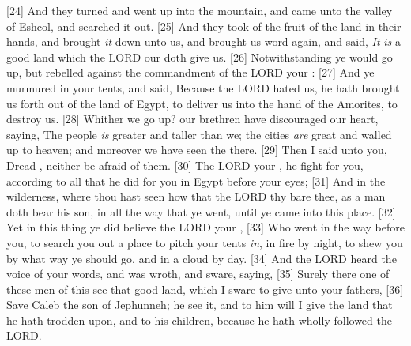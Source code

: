 [24] \textcolor[cmyk]{0.99998,1,0,0}{And they turned and went up into the mountain, and came unto the valley of Eshcol, and searched it out.}
[25] \textcolor[cmyk]{0.99998,1,0,0}{And they took of the fruit of the land in their hands, and brought \emph{it} down unto us, and brought us word again, and said, \emph{It} \emph{is} a good land which the LORD our  doth give us.}
[26] \textcolor[cmyk]{0.99998,1,0,0}{Notwithstanding ye would  go up, but rebelled against the commandment of the LORD your :}
[27] \textcolor[cmyk]{0.99998,1,0,0}{And ye murmured in your tents, and said, Because the LORD hated us, he hath brought us forth out of the land of Egypt, to deliver us into the hand of the Amorites, to destroy us.}
[28] \textcolor[cmyk]{0.99998,1,0,0}{Whither  we go up? our brethren have discouraged our heart, saying, The people \emph{is} greater and taller than we; the cities \emph{are} great and walled up to heaven; and moreover we have seen the  there.}
[29] \textcolor[cmyk]{0.99998,1,0,0}{Then I said unto you, Dread , neither be afraid of them.}
[30] \textcolor[cmyk]{0.99998,1,0,0}{The LORD your  , he  fight for you, according to all that he did for you in Egypt before your eyes;}
[31] \textcolor[cmyk]{0.99998,1,0,0}{And in the wilderness, where thou hast seen how that the LORD thy  bare thee, as a man doth bear his son, in all the way that ye went, until ye came into this place.}
[32] \textcolor[cmyk]{0.99998,1,0,0}{Yet in this thing ye did  believe the LORD your ,}
[33] \textcolor[cmyk]{0.99998,1,0,0}{Who went in the way before you, to search you out a place to pitch your tents \emph{in}, in fire by night, to shew you by what way ye should go, and in a cloud by day.}
[34] \textcolor[cmyk]{0.99998,1,0,0}{And the LORD heard the voice of your words, and was wroth, and sware, saying,}
[35] \textcolor[cmyk]{0.99998,1,0,0}{Surely there   one of these men of this  see that good land, which I sware to give unto your fathers,}
[36] \textcolor[cmyk]{0.99998,1,0,0}{Save Caleb the son of Jephunneh; he  see it, and to him will I give the land that he hath trodden upon, and to his children, because he hath wholly followed the LORD.}
